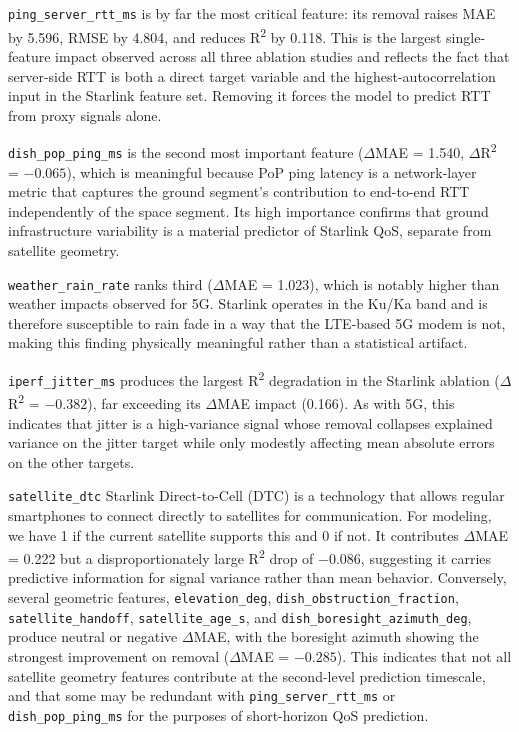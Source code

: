 \documentclass[12pt]{article}
\begin{document}
\texttt{ping\_server\_rtt\_ms} is by far the most critical feature: its removal raises MAE by 5.596, RMSE by 4.804, and reduces R\textsuperscript{2} by 0.118. This is the largest single-feature impact observed across all three ablation studies and reflects the fact that server-side RTT is both a direct target variable and the highest-autocorrelation input in the Starlink feature set. Removing it forces the model to predict RTT from proxy signals alone.

\texttt{dish\_pop\_ping\_ms} is the second most important feature ($\Delta$MAE = 1.540, $\Delta$R\textsuperscript{2} = $-0.065$), which is meaningful because PoP ping latency is a network-layer metric that captures the ground segment's contribution to end-to-end RTT independently of the space segment. Its high importance confirms that ground infrastructure variability is a material predictor of Starlink QoS, separate from satellite geometry.

\texttt{weather\_rain\_rate} ranks third ($\Delta$MAE = 1.023), which is notably higher than weather impacts observed for 5G. Starlink operates in the Ku/Ka band and is therefore susceptible to rain fade in a way that the LTE-based 5G modem is not, making this finding physically meaningful rather than a statistical artifact.

\texttt{iperf\_jitter\_ms} produces the largest R\textsuperscript{2} degradation in the Starlink ablation ($\Delta$R\textsuperscript{2} = $-0.382$), far exceeding its $\Delta$MAE impact (0.166). As with 5G, this indicates that jitter is a high-variance signal whose removal collapses explained variance on the jitter target while only modestly affecting mean absolute errors on the other targets.

\texttt{satellite\_dtc} Starlink Direct-to-Cell (DTC) is a technology that allows regular smartphones to connect directly to satellites for communication. For modeling, we have 1 if the current satellite supports this and 0 if not. It contributes $\Delta$MAE = 0.222 but a disproportionately large R\textsuperscript{2} drop of $-0.086$, suggesting it carries predictive information for signal variance rather than mean behavior. Conversely, several geometric features, \texttt{elevation\_deg}, \texttt{dish\_obstruction\_fraction}, \texttt{satellite\_handoff}, \texttt{satellite\_age\_s}, and \texttt{dish\_boresight\_azimuth\_deg}, produce neutral or negative $\Delta$MAE, with the boresight azimuth showing the strongest improvement on removal ($\Delta$MAE = $-0.285$). This indicates that not all satellite geometry features contribute at the second-level prediction timescale, and that some may be redundant with \texttt{ping\_server\_rtt\_ms} or \texttt{dish\_pop\_ping\_ms} for the purposes of short-horizon QoS prediction.
\end{document}
